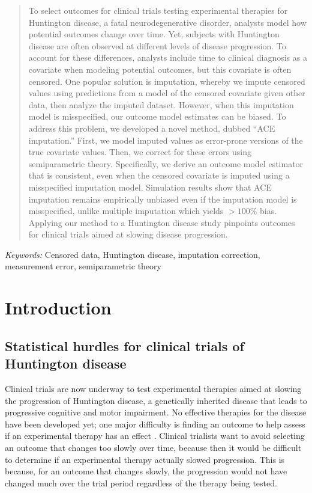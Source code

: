 \documentclass[12pt]{article}
\begin{document}
\bigskip
\begin{abstract}
To select outcomes for clinical trials testing experimental therapies for Huntington disease, a fatal neurodegenerative disorder, analysts model how potential outcomes change over time. Yet, subjects with Huntington disease are often observed at different levels of disease progression. To account for these differences, analysts include time to clinical diagnosis as a covariate when modeling potential outcomes, but this covariate is often censored. One popular solution is imputation, whereby we impute censored values using predictions from a model of the censored covariate given other data, then analyze the imputed dataset. However, when this imputation model is misspecified, our outcome model estimates can be biased. To address this problem, we developed a novel method, dubbed ``ACE imputation.'' First, we model imputed values as error-prone versions of the true covariate values. Then, we correct for these errors using semiparametric theory. Specifically, we derive an outcome model estimator that is consistent, even when the censored covariate is imputed using a misspecified imputation model. Simulation results show that ACE imputation remains empirically unbiased even if the imputation model is misspecified, unlike multiple imputation which yields $>100\%$ bias. Applying our method to a Huntington disease study pinpoints outcomes for clinical trials aimed at slowing disease progression.
\end{abstract}

\noindent%
{\it Keywords:} Censored data, Huntington disease, imputation correction, measurement error, semiparametric theory
\vfill

\newpage
{} %

\section{Introduction}
\label{sec:intro}
\subsection{Statistical hurdles for clinical trials of Huntington disease}
Clinical trials are now underway to test experimental therapies aimed at slowing the progression of Huntington disease, a genetically inherited disease that leads to progressive cognitive and motor impairment. No effective therapies for the disease have been developed yet; one major difficulty is finding an outcome to help assess if an experimental therapy has an effect \citep{langbehn2020clinical}. Clinical trialists want to avoid selecting an outcome that changes too slowly over time, because then it would be difficult to determine if an experimental therapy actually slowed progression. This is because, for an outcome that changes slowly, the progression would not have changed much over the trial period regardless of the therapy being tested.
\end{document}
